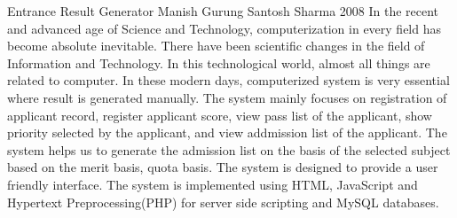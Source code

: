  \begin{conf-abstract}[]
{Entrance Result Generator}
{
Manish Gurung
Santosh Sharma
}
{2008}
	In the recent and advanced age of Science and Technology, computerization in every field has become 
absolute inevitable. There have been scientific changes in the field of Information and Technology. In this 
technological world, almost all things are related to computer. In these modern days, computerized system is 
very essential where result is generated manually. The system mainly focuses on registration of 
applicant record, register applicant score, view pass list of the applicant, show priority selected by the 
applicant, and view addmission list of the applicant. The system helps us to generate the admission list on the
basis of the selected subject based on the merit basis, quota basis. The system is designed to provide a user 
friendly interface. The system is implemented using HTML, JavaScript and Hypertext Preprocessing(PHP) for server 
side scripting and MySQL databases.
  \end{conf-abstract}